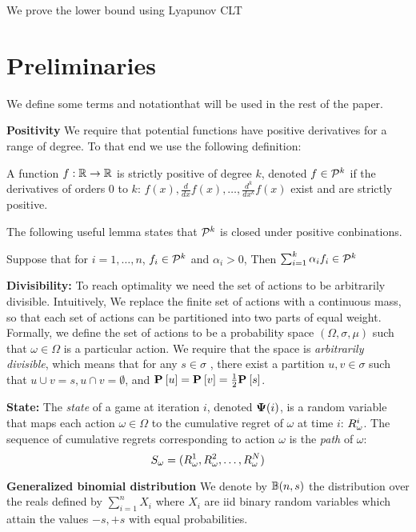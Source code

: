 \documentclass{article}[12pt]
\begin{document}
We prove the lower bound using Lyapunov CLT 
~\cite{billingsley1995central}


\section{Preliminaries} \label{sec:preliminaries}

We define some terms and notationthat will be used in the rest of the paper.

{\bf Positivity}
We require that potential functions have positive derivatives for a
range of degree. To that end we use the following definition:
\begin{definition}
A function $f:\reals \to \reals$ is strictly positive of degree $k$, 
denoted $f \in \SP{k}$ if the derivatives of orders 0 to $k$:  
$f(x), \frac{d}{dx}f(x), \ldots, \frac{d^k}{dx^k}f(x)$ exist and are strictly positive.
\end{definition}
The following useful lemma states that $\SP{k}$ is closed under positive conbinations.
\begin{lemma}  \label{lemma:SP-pos-comb}
  Suppose that for $i =1,\ldots,n$, $f_i \in \SP{k}$ and $\alpha_i>0$,
  Then $\sum_{i=1}^k \alpha_i f_i \in \SP{k}$
\end{lemma}


{\bf Divisibility:} To reach optimality we need the set of actions to
be arbitrarily divisible. Intuitively, We replace the finite set of
actions with a continuous mass, so that each set of actions can be
partitioned into two parts of equal weight.  Formally, we define the
set of actions to be a probability space $(\Omega,\sigma,\mu)$ such
that $\omega \in \Omega$ is a particular action. We require that the
space is {\em arbitrarily divisible}, which means that for any
$s \in \sigma$ , there exist a partition $u,v \in \sigma$ such that
$u \cup v = s, u \cap v = \emptyset$, and
$\P{}{u}=\P{}{v}=\frac{1}{2} \P{}{s}$.

{\bf State:} The {\em state} of a game at iteration $i$, denoted $\state(i)$, is
a random variable that maps each action $\omega \in \Omega$ to the
cumulative regret of $\omega$ at time $i$: $\R_\omega^i$. The sequence
of cumulative regrets corresponding to action $\omega$ is the {\em
  path} of $\omega$:
\begin{equation} \label{eqn:path}
  S_{\omega}=(\R_\omega^1,\R_\omega^2,\ldots,\R_\omega^N)
\end{equation}

{\bf  Generalized binomial distribution}
We denote by $\Binom(n,s)$ the distribution over the reals defined by
$\sum_{i=1}^n X_i$ where $X_i$ are iid binary random variables which
attain the values $-s,+s$ with equal probabilities.
\end{document}
